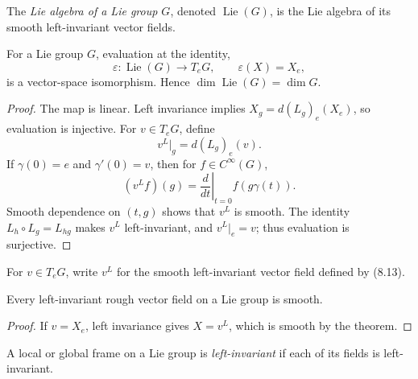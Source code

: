 \begin{definition}
\label{def:8-60-extra-5}



The \emph{Lie algebra of a Lie group $G$}, denoted $\operatorname{Lie}(G)$,
is the Lie algebra of its smooth left-invariant vector fields.
\end{definition}

\begin{theorem}
\label{thm:8-37}




For a Lie group $G$, evaluation at the identity,
\[
\varepsilon\colon\operatorname{Lie}(G)\longrightarrow T_eG,
\qquad \varepsilon(X)=X_e,
\]
is a vector-space isomorphism. Hence
$\dim\operatorname{Lie}(G)=\dim G$.
\end{theorem}

\begin{proof}

\sketch The map is linear. Left invariance implies
$X_g=d(L_g)_e(X_e)$, so evaluation is injective. For $v\in T_eG$, define
\[
v^L|_g=d(L_g)_e(v). \tag{8.13}
\]
If $\gamma(0)=e$ and $\gamma'(0)=v$, then for $f\in C^\infty(G)$,
\[
(v^Lf)(g)=\left.\frac{d}{dt}\right|_{t=0}f(g\gamma(t)).
\]
Smooth dependence on $(t,g)$ shows that $v^L$ is smooth. The identity
$L_h\circ L_g=L_{hg}$ makes $v^L$ left-invariant, and $v^L|_e=v$; thus
evaluation is surjective.
\end{proof}

\begin{notation}
\label{not:8-60-extra-6}



For $v\in T_eG$, write $v^L$ for the smooth left-invariant vector field
defined by (8.13).
\end{notation}

\begin{corollary}
\label{cor:8-38}




Every left-invariant rough vector field on a Lie group is smooth.
\end{corollary}

\begin{proof}

\sketch If $v=X_e$, left invariance gives $X=v^L$, which is smooth by the
theorem.
\end{proof}

\begin{definition}
\label{def:8-60-extra-7}




A local or global frame on a Lie group is \emph{left-invariant} if each of its
fields is left-invariant.
\end{definition}

